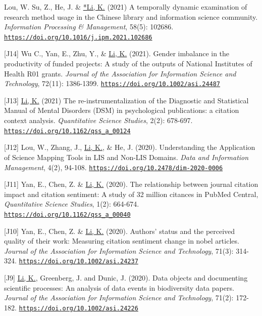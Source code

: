 \documentclass[margin, 10pt]{res} %
\begin{document}
\begin{resume}
[J15] Lou, W. Su, Z., He, J. \& \underline{*Li, K.} (2021) A temporally dynamic examination of research method usage in the Chinese library and information science community. \textit{Information Processing \& Management}, 58(5): 102686. \href{https://doi.org/10.1016/j.ipm.2021.102686}{\nolinkurl{https://doi.org/10.1016/j.ipm.2021.102686}} 

[J14] Wu C., Yan, E., Zhu, Y., \& \underline{Li, K.} (2021). Gender imbalance in the productivity of funded projects: A study of the outputs of National Institutes of Health R01 grants. \textit{Journal of the Association for Information Science and Technology}, 72(11): 1386-1399. \href{https://doi.org/10.1002/asi.24487}{\nolinkurl{https://doi.org/10.1002/asi.24487}}

[J13] \underline{Li, K.} (2021) The re-instrumentalization of the Diagnostic and Statistical Manual of Mental Disorders (DSM) in psychological publications: a citation context analysis. \textit{Quantitative Science Studies}, 2(2): 678-697. \href{https://doi.org/10.1162/qss_a_00124}{\nolinkurl{https://doi.org/10.1162/qss_a_00124}}

[J12] Lou, W., Zhang, J., \underline{Li, K.}, \& He, J. (2020). Understanding the Application of Science Mapping Tools in LIS and Non-LIS Domains. \textit{Data and Information Management}, 4(2), 94-108. \href{https://doi.org/10.2478/dim-2020-0006}{\nolinkurl{https://doi.org/10.2478/dim-2020-0006}}

[J11] Yan, E., Chen, Z. \& \underline{Li, K.} (2020). The relationship between journal citation impact and citation sentiment: A study of 32 million citances in PubMed Central, \textit{Quantitative Science Studies}, 1(2): 664-674. \href{https://doi.org/10.1162/qss\_a\_00040}{\nolinkurl{https://doi.org/10.1162/qss_a_00040}}

[J10] Yan, E., Chen, Z. \& \underline{Li, K.} (2020). Authors' status and the perceived quality of their work: Measuring citation sentiment change in nobel articles. \textit{Journal of the Association for Information Science and Technology}, 71(3): 314-324. \href{https://doi.org/10.1002/asi.24237}{\nolinkurl{https://doi.org/10.1002/asi.24237}}

[J9] \underline{Li, K.}, Greenberg, J. and Dunic, J. (2020). Data objects and documenting scientific processes: An analysis of data events in biodiversity data papers. \textit{Journal of the Association for Information Science and Technology}, 71(2): 172-182. \href{https://doi.org/10.1002/asi.24226}{\nolinkurl{https://doi.org/10.1002/asi.24226}}


\end{resume}
\end{document}
